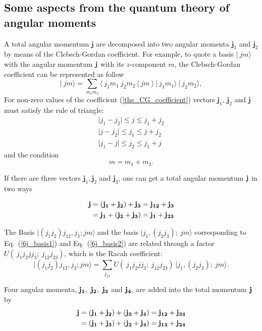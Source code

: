 \documentclass[12pt,a4paper,twoside]{article}
\begin{document}
\subsection*{Some aspects from the quantum theory of angular moments}
A total angular momentum $\mathbf{j}$ are decomposed into two angular momenta $\mathbf{j}_1$ and $\mathbf{j}_2$ by means of the Clebsch-Gordan coefficient. For example, to quote a basis $\vert ~ jm \rangle $ with the angular momentum $\bf j$ with its $z$-component $m$, the Clebsch-Gordan coefficient can be represented as follow
\begin{equation}
\label{the_CG_coefficient}
\vert ~ jm \rangle =\sum_{m_1 m_2} \langle ~ j_1 m_1~j_2 m_2~ \vert ~j m~  \rangle ~ \vert ~j_1 m_1 \rangle~ \vert ~j_2 m_2 \rangle,
\end{equation}
For non-zero values of the coefficient (\ref{the_CG_coefficient}) vectors $\mathbf{j}_1$, $\mathbf{j}_2$ and $\mathbf{j}$ must satisfy the rule of triangle:
\begin{align*}
\vert j_1 - j_2 \vert \leq j \leq j_1 + j_2 \\
\vert j - j_2 \vert \leq j_1 \leq j + j_2 \\ 
\vert j_1 - j \vert \leq j_2 \leq j_1 + j 
\end{align*}
and the condition
\begin{equation*}
m=m_1+m_2.
\end{equation*}


If there are three vectors $\mathbf{j}_1, \mathbf{j}_2$ and $\mathbf{j}_3$, one can get a total angular momentum $\bf j$ in two ways

\begin{align}
\label{6j_basis1}
\bf j & =\bf \left( j_1 + j_2 \right) + j_3 = j_{12} + j_3 \\
\label{6j_basis2}		
& = \bf j_1 + \left( j_2  + j_3 \right) = j_1 +j_{23}
\end{align}

The Basis $ \vert (j_1 j_2)j_{12},j_3; jm \rangle$ and the basis $\vert j_1,(j_2 j_3); ~jm \rangle$ corresponding to Eq.~(\ref{6j_basis1}) and Eq.~(\ref{6j_basis2}) are related through a factor $U(~j_1 j_2 j j_3;~ j_{12} j_{23})$, which is the Racah coefficient:
\begin{equation}
\vert (j_1 j_2)j_{12},j_3; jm \rangle = \sum_{j_{23}} U(~j_1 j_2 j j_3;~ j_{12} j_{23}) ~ \vert j_1,(j_2 j_3); ~jm \rangle.
\end{equation}

Four angular momenta, $\bf j_1,~j_2,~j_3$ and $\bf j_4$, are added into the total momentum $\bf j$ by
\begin{align}
\label{9j_basis1}
\bf j & =\bf \left( j_1 + j_2 \right) + ( j_3 + j_4) = j_{12} + j_{34} \\
\label{9j_basis2}		
& = \bf ( j_1 + j_3 ) + \left( j_2  + j_4 \right) = j_{13} +j_{24}
\end{align}
\end{document}
